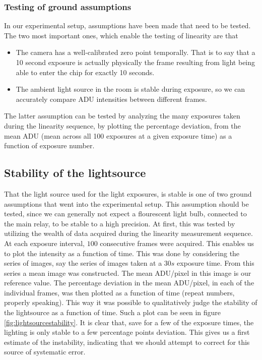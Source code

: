 \documentclass[../main.tex]{subfiles}
\begin{document}
		\subsubsection{Testing of ground assumptions}
		In our experimental setup, assumptions have been made that need to be tested. The two most important ones, which enable the testing of linearity are that 
		\begin{itemize}
			\item The camera has a well-calibrated zero point temporally. That is to say that a 10 second exposure is actually physically the frame resulting from light being able to enter the chip for exactly 10 seconds.
			\item The ambient light source in the room is stable during exposure, so we can accurately compare ADU intensities between different frames.
		\end{itemize}
		The latter assumption can be tested by analyzing the many exposures taken during the linearity sequence, by plotting the percentage deviation, from the mean ADU (mean across all 100 exposures at a given exposure time) as a function of exposure number.
		
		\subsection{Stability of the lightsource}
		That the light source used for the light exposures, is stable is one of two ground assumptions that went into the experimental setup. This assumption should be tested, since we can generally not expect a flourescent light bulb, connected to the main relay, to be stable to a high precision. At first, this was tested by utilizing the wealth of data acquired during the linearity measurement sequence. At each exposure interval, $100$ consecutive frames were acquired. This enables us to plot the intensity as a function of time. This was done by considering the series of images, say the series of images taken at a $30s$ exposure time. From this series a mean image was constructed. The mean ADU/pixel in this image is our reference value. The percentage deviation in the mean ADU/pixel, in each of the individual frames, was then plotted as a function of time (repeat numbers, properly speaking). This way it was possible to qualitatively judge the stability of the lightsource as a function of time. Such a plot can be seen in figure \ref{fig:lightsourcestability}. It is clear that, save for a few of the exposure times, the lighting is only stable to a few percentage points deviation. This gives us a first estimate of the instability, indicating that we should attempt to correct for this source of systematic error. 
		
\end{document}
